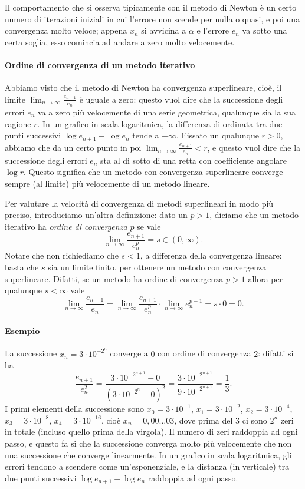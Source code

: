 \documentclass[a4paper]{report}
\theoremstyle{definiton}
\theoremstyle{remark}
\begin{document}
Il comportamento che si osserva tipicamente con il metodo di Newton è un certo numero di iterazioni iniziali in cui l'errore non scende per nulla o quasi, e poi una convergenza molto veloce; appena $x_n$ si avvicina a $\alpha$ e l'errore $e_n$ va sotto una certa soglia, esso comincia ad andare a zero molto velocemente.

\paragraph{Ordine di convergenza di un metodo iterativo}

Abbiamo visto che il metodo di Newton ha convergenza superlineare, cioè, il limite $\lim_{n \to \infty }\frac{e_{n+1}}{e_n}$ è uguale a zero: questo vuol dire che la successione degli errori $e_n$ va a zero più velocemente di una serie geometrica, qualunque sia la sua ragione $r$. In un grafico in scala logaritmica, la differenza di ordinata tra due punti successivi $\log e_{n+1} - \log e_n$ tende a $-\infty$. Fissato un qualunque $r>0$, abbiamo che da un certo punto in poi $\lim_{n \to \infty }\frac{e_{n+1}}{e_n} < r$, e  questo vuol dire che la successione degli errori $e_n$ sta al di sotto di una retta con coefficiente angolare $\log r$. Questo significa che un metodo con convergenza superlineare converge sempre (al limite) più velocemente di un metodo lineare.

Per valutare la velocità di convergenza di metodi superlineari in modo più preciso, introduciamo un'altra definizione: dato un $p > 1$, diciamo che un metodo iterativo ha \emph{ordine di convergenza $p$} se vale
\[
\lim_{n \to \infty }\frac{e_{n+1}}{e_n^p} = s \in (0,\infty).
\]
Notare che non richiediamo che $s<1$, a differenza della convergenza lineare: basta che $s$ sia un limite finito, per ottenere un metodo con convergenza superlineare. Difatti, se un metodo ha ordine di convergenza $p>1$ allora per qualunque $s<\infty$ vale
\begin{equation} \label{almeno}
\lim_{n \to \infty }\frac{e_{n+1}}{e_n} = \lim_{n \to \infty }\frac{e_{n+1}}{e_n^p} \cdot \lim_{n \to \infty } e_n^{p-1} = s \cdot 0 = 0.
\end{equation}

\paragraph{Esempio} La successione $x_n = 3\cdot 10^{-2^n}$ converge a $0$ con ordine di convergenza $2$: difatti si ha
\[
\frac{e_{n+1}}{e_n^2} = \frac{3\cdot 10^{-2^{n+1}}-0}{(3\cdot 10^{-2^n} - 0)^2} = \frac{3\cdot 10^{-2^{n+1}}}{9\cdot 10^{-2^{n+1}}} = \frac13.
\]
I primi elementi della successione sono $x_0 = 3\cdot 10^{-1}$, $x_1 = 3\cdot 10^{-2}$, $x_2 = 3\cdot 10^{-4}$, $x_3 = 3\cdot 10^{-8}$, $x_4 = 3\cdot 10^{-16}$, cioè $x_n = 0,00\dots03$, dove prima del $3$ ci sono $2^n$ zeri in totale (incluso quello prima della virgola). Il numero di zeri raddoppia ad ogni passo, e questo fa sì che la successione converga molto più velocemente che non una successione che converge linearmente. In un grafico in scala logaritmica, gli errori tendono a scendere come un'esponenziale, e la distanza (in verticale) tra due punti successivi $\log e_{n+1} - \log e_n$ raddoppia ad ogni passo.
\end{document}
